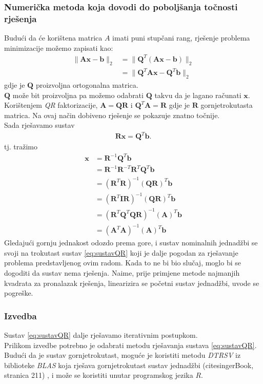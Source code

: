 \documentclass[a4paper,twoside,12pt]{memoir} %
\begin{document}
\subsubsection{Numerička metoda koja dovodi do poboljšanja točnosti rješenja}
Budući da će korištena matrica $A$ imati puni stupčani rang, rješenje problema minimizacije možemo zapisati kao:
\begin{align}
	\| \mathbf{A}\mathbf{x} - \mathbf{b} \|_2	
	& = \| \mathbf{Q}^T(\mathbf{A}\mathbf{x} - \mathbf{b}) \|_2 \\
	& = \| \mathbf{Q}^T \mathbf{A}\mathbf{x} - \mathbf{Q}^T \mathbf{b} \|_2	
\end{align}
gdje je $\mathbf{Q}$ proizvoljna ortogonalna matrica.\\
$\mathbf{Q}$ može bit proizvoljna pa možemo odabrati $\mathbf{Q}$ takvu da je lagano računati $\mathbf{x}$.
Korištenjem \textit{QR} faktorizacije, $\mathbf{A} = \mathbf{QR}$ i $\mathbf{Q}^T\mathbf{A} = \mathbf{R}$ gdje je $\mathbf{R}$ gornjetrokutasta matrica.
Na ovaj način dobiveno rješenje se pokazuje znatno točnije.\\
Sada rješavamo sustav
\begin{align}\label{eq:sustavQR}
	\mathbf{R}\mathbf{x} = \mathbf{Q}^T\mathbf{b}.
\end{align}
tj. tražimo  
\begin{align*}
\mathbf{x} & = \mathbf{R}^{-1}\mathbf{Q}^T\mathbf{b} \\
& = \mathbf{R}^{-1}\mathbf{R}^{-T}\mathbf{R}^{T}\mathbf{Q}^T\mathbf{b} \\
& = (\mathbf{R}^{T}\mathbf{R})^{-1}(\mathbf{QR})^{T}\mathbf{b} \\
& = (\mathbf{R}^{T} \mathbf{I} \mathbf{R})^{-1}(\mathbf{QR})^{T}\mathbf{b}  \\
& = (\mathbf{R}^{T} \mathbf{Q}^T\mathbf{Q} \mathbf{R})^{-1}(\mathbf{A})^{T}\mathbf{b} \\
& = (\mathbf{A}^{T}\mathbf{A})^{-1}(\mathbf{A})^{T}\mathbf{b}
\end{align*}
Gledajući gornju jednakost odozdo prema gore, i sustav nominalnih jednadžbi se svoji na trokutast sustav \ref{eq:sustavQR} koji je dalje pogodan za rješavanje problema predstavljenog ovim radom.
Kada to ne bi bio slučaj, moglo bi se dogoditi da sustav nema rješenja. Naime, prije primjene metode najmanjih kvadrata za pronalazak rješenja, linearizira se početni sustav jednadžbi, uvode se pogreške.

\subsubsection{Izvedba}
Sustav \ref{eq:sustavQR} dalje rješavamo iterativnim postupkom.\\
Prilikom izvedbe potrebno je odabrati metodu rješavanja sustava \ref{eq:sustavQR}.
Budući da je sustav gornjetrokutast, moguće je koristiti metodu \textit{DTRSV} iz biblioteke \textit{BLAS}
koja rješava gornjetrokutast sustav jednadžbi (cite{singerBook}, stranica 211) , i može se koristiti unutar programskog jezika $R$.
\end{document}
